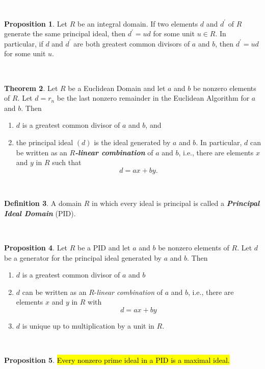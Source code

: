 \documentclass{article}
\theoremstyle{definition}
\newtheorem{thm}{Theorem}[section]
\newtheorem{prop}[thm]{Proposition}
\newtheorem{defn}[thm]{Definition}
\newcommand{\nl}{\textcolor{white}{nothing}}
\newcommand{\p}{\prime}
\begin{document}
\nl

\begin{prop}
Let $R$ be an integral domain. If two elements $d$ and $d^\p$ of $R$ generate the same principal ideal, then $d^\p = ud$ for some unit $u\in R$. In particular, if $d$ and $d^\p$ are both greatest common divisors of $a$ and $b$, then $d^\p = ud$ for some unit $u$.
\end{prop}

\nl

\begin{thm}
Let $R$ be a Euclidean Domain and let $a$ and $b$ be nonzero elements of $R$. Let $d = r_n$ be the last nonzero remainder in the Euclidean Algorithm for $a$ and $b$. Then
\begin{enumerate}
\item $d$ is a greatest common divisor of $a$ and $b$, and 
\item the principal ideal $(d)$ is the ideal generated by $a$ and $b$. In particular, $d$ can be written as an $R$\textbf{\textit{-linear combination}} of $a$ and $b$, i.e., there are elements $x$ and $y$ in $R$ such that 
\[d = ax + by.\]
\end{enumerate}
\end{thm}

\nl

\begin{defn}
A domain $R$ in which every ideal is principal is called a \textbf{\textit{Principal Ideal Domain}} (PID).
\end{defn}

\nl

\begin{prop}
Let $R$ be a PID and let $a$ and $b$ be nonzero elements of $R$. Let $d$ be a generator for the principal ideal generated by $a$ and $b$. Then
\begin{enumerate}
\item $d$ is a greatest common divisor of $a$ and $b$
\item $d$ can be written as an $R$-\textit{linear combination} of $a$ and $b$, i.e., there are elements $x$ and $y$ in $R$ with 
\[d = ax + by\]
\item $d$ is unique up to multiplication by a unit in $R$.
\end{enumerate}
\end{prop}

\nl

\begin{prop}
\hl{Every nonzero prime ideal in a PID is a maximal ideal.} 
\end{prop}
\end{document}

